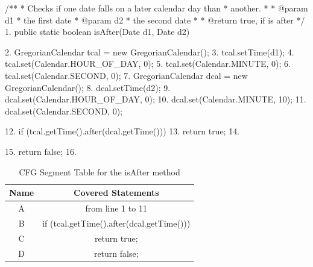 \documentclass[fontsize=12pt,paper=letter,twoside]{scrartcl}
\begin{document}
\newpage
\begin{code}
	/**
	 * Checks if one date falls on a later calendar day than
	 * another.
	 * 
	 * @param d1
	 *            the first date
	 * @param d2
	 *            the second date
	 * 
	 * @return true, if is after
	 */
	1. public static boolean isAfter(Date d1, Date d2) {

	2.	GregorianCalendar tcal = new GregorianCalendar();
	3.	tcal.setTime(d1);
	4.	tcal.set(Calendar.HOUR_OF_DAY, 0);
	5.	tcal.set(Calendar.MINUTE, 0);
	6.	tcal.set(Calendar.SECOND, 0);
	7.	GregorianCalendar dcal = new GregorianCalendar();
	8.	dcal.setTime(d2);
	9.	dcal.set(Calendar.HOUR_OF_DAY, 0);
	10.	dcal.set(Calendar.MINUTE, 10);
	11.	dcal.set(Calendar.SECOND, 0);

	12.	if (tcal.getTime().after(dcal.getTime())) {
	13.		return true;
	14.	}

	15.	return false;
	16. }
\end{code}

\begin{table}[h]
\centering
\begin{tabular}{|c | c |}
	\cline{1-2}
	\textbf{Name} & \textbf{Covered Statements}\\ \hline
	A & from line 1 to 11 \\ \hline
	B & if (tcal.getTime().after(dcal.getTime())) \\ \hline
	C & return true; \\ \Xhline{2pt}
	D & return false; \\ \hline
\end{tabular}
\caption {CFG Segment Table for the isAfter method}
\label{tbl:dtt_cfg_segments}
\end{table}
\end{document}
